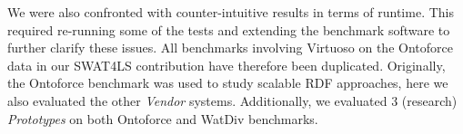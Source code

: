 We were also confronted with counter-intuitive results in terms of runtime. This required re-running some of the tests and extending the benchmark software to further clarify these issues. All benchmarks involving Virtuoso on the Ontoforce data in our SWAT4LS contribution have therefore been duplicated.
Originally, the Ontoforce benchmark was used to study scalable RDF approaches, here we also evaluated the other \emph{Vendor} systems. Additionally, we evaluated 3 (research) \emph{Prototypes} on both Ontoforce and WatDiv benchmarks.

